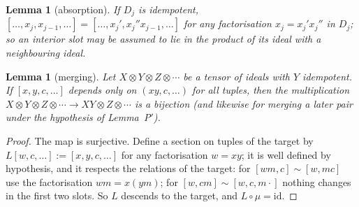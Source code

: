 \documentclass[11pt]{amsart}
\newtheorem{lem}[thm]{Lemma}
\theoremstyle{definition}
\begin{document}
\begin{lem}[absorption]\label{lem:absorb}
If $D_j$ is idempotent, $[\dots,x_j,x_{j-1},\dots]=[\dots,x_j',x_j''x_{j-1},\dots]$
for any factorisation $x_j=x_j'x_j''$ in $D_j$; so an interior slot may be
assumed to lie in the product of its ideal with a neighbouring ideal.
\end{lem}

\begin{lem}[merging]\label{lem:merge}
Let $X\otimes Y\otimes Z\otimes\cdots$ be a tensor of ideals with $Y$ idempotent.
If $[x,y,c,\dots]$ depends only on $(xy,c,\dots)$ for \emph{all} tuples, then
the multiplication $X\otimes Y\otimes Z\otimes\cdots\to XY\otimes Z\otimes\cdots$
is a bijection (and likewise for merging a later pair under the hypothesis of
Lemma~\textup{P$'$}).
\end{lem}
\begin{proof}
The map is surjective. Define a section on tuples of the target by
$L[w,c,\dots]:=[x,y,c,\dots]$ for any factorisation $w=xy$; it is well defined
by hypothesis, and it respects the relations of the target: for $[wm,c]\sim[w,mc]$
use the factorisation $wm=x(ym)$; for $[w,cm]\sim[w,c,m\cdot]$ nothing changes
in the first two slots. So $L$ descends to the target, and $L\circ\mu=\mathrm{id}$.
\end{proof}
\end{document}
